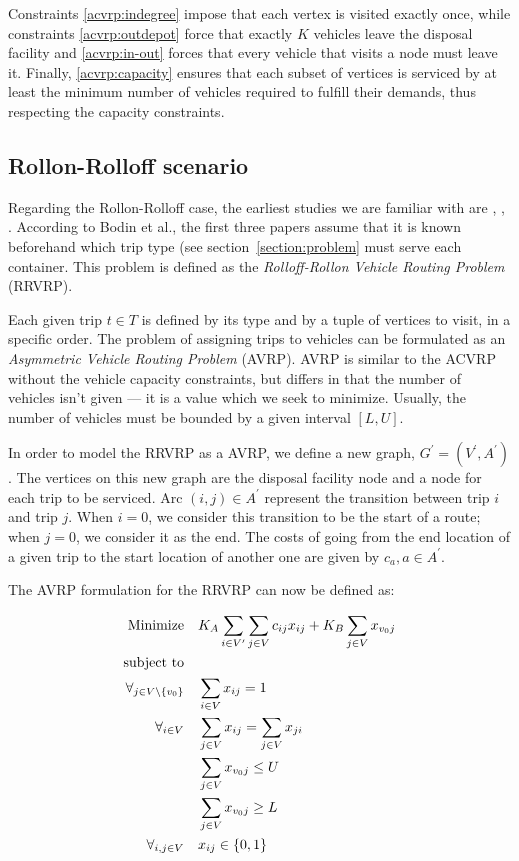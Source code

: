 Constraints \eqref{acvrp:indegree} impose that each vertex is visited exactly
once, while constraints \eqref{acvrp:outdepot} force that exactly $K$ vehicles
leave the disposal facility and \eqref{acvrp:in-out} forces that every vehicle
that visits a node must leave it. Finally, \eqref{acvrp:capacity} ensures that
each subset of vertices is serviced by at least the minimum number of vehicles
required to fulfill their demands, thus respecting the capacity constraints.





\subsection{Rollon-Rolloff scenario}

Regarding the Rollon-Rolloff case, the earliest studies we are familiar with
are \citet{Cristallo94}, \citet{Meulemeester97}, \citet{Bodin00}. According to
Bodin et al., the first three papers assume that it is known beforehand which
trip type (see section~\ref{section:problem} must serve each container. This
problem is defined as the \textit{Rolloff-Rollon Vehicle Routing Problem}
(RRVRP).

Each given trip $t \in T$ is defined by its type and by a tuple of vertices to
visit, in a specific order. The problem of assigning trips to vehicles can be
formulated as an \textit{Asymmetric Vehicle Routing Problem} (AVRP). AVRP is
similar to the ACVRP without the vehicle capacity constraints, but differs in
that the number of vehicles isn't given --- it is a value which we seek to
minimize. Usually, the number of vehicles must be bounded by a given interval
$[L, U]$.

In order to model the RRVRP as a AVRP, we define a new graph, $G^\prime =
(V^\prime, A^\prime)$. The vertices on this new graph are the disposal facility
node and a node for each trip to be serviced. Arc $(i, j) \in A^\prime$
represent the transition between trip $i$ and trip $j$. When $i = 0$, we
consider this transition to be the start of a route; when $j = 0$, we consider
it as the end. The costs of going from the end location of a given trip to the
start location of another one are given by $c_{a}, a \in A^\prime$.

The AVRP formulation for the RRVRP can now be defined as:

\begin{align}
	\mbox{Minimize} & \quad K_A \sum_{i \in V^\prime} \sum_{j \in V} c_{ij} x_{ij} +
				K_B \sum_{j \in V} x_{v_0j}
	\\
	\mbox{subject to} & \notag{}
	\\
	\forall_{j \in V \setminus \{v_0\}} & \quad \sum_{i \in V} x_{ij} = 1
	\label{avrp:indegree}
	\\
	\forall_{i \in V} & \quad \sum_{j \in V} x_{ij} = \sum_{j \in V} x_{ji}
	\label{avrp:in-out}
	\\
	& \quad \sum_{j \in V} x_{v_0j} \leq U \label{avrp:upper-k} \\
	& \quad \sum_{j \in V} x_{v_0j} \geq L \label{avrp:lower-k} \\
	\forall_{i, j \in V} & \quad x_{ij} \in \{0, 1\}
\end{align}

